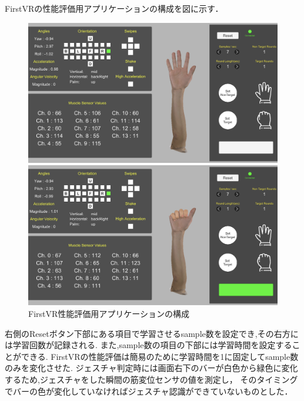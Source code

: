 \documentclass{ltjsreport}
\begin{document}
\clearpage

		FirstVRの性能評価用アプリケーションの構成を図に示す．
		\begin{figure}[H]
		\centering
		\begin{minipage}{0.75\columnwidth}
		\centering
		\includegraphics[width = \columnwidth]{../figs/IMG_1866.PNG}
		\end{minipage}
		\hspace{0.04\columnwidth}
		\begin{minipage}{0.75\columnwidth}
		\centering
		\includegraphics[width = \columnwidth]{../figs/IMG_1867.PNG}
		\end{minipage}
		\caption{FirstVR性能評価用アプリケーションの構成}
		\label{fig:FirstVRapplication}
		\end{figure}
		右側のResetボタン下部にある項目で学習させるsample数を設定でき,その右方には学習回数が記録される.
		また,sample数の項目の下部には学習時間を設定することができる.
		FirstVRの性能評価は簡易のために学習時間を1に固定してsample数のみを変化させた.
		ジェスチャ判定時には画面右下のバーが白色から緑色に変化するため,ジェスチャをした瞬間の筋変位センサの値を測定し，
		そのタイミングでバーの色が変化していなければジェスチャ認識ができていないものとした．
\end{document}
